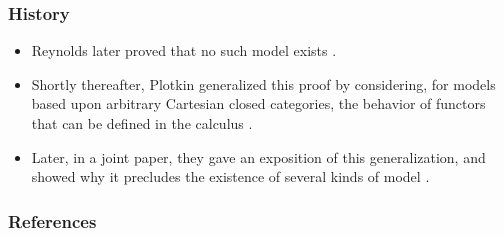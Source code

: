 \begin{frame}[fragile]
    \frametitle{History}
  
    \begin{itemize}
        \item Reynolds later proved that no such model exists \cite{reynold-not-set-theoretic}.
        \item Shortly thereafter, Plotkin generalized this proof by considering, for models based upon arbitrary Cartesian closed categories, the behavior of functors that can be defined in the calculus \cite{plotkin-non-existing-article}.
        \item Later, in a joint paper, they gave an exposition of this generalization, and showed why it precludes the existence of several kinds of model \cite{REYNOLDS19931}.
    \end{itemize}
\end{frame}

\begin{frame}[t,allowframebreaks]
\nocite{*}
\frametitle{References}


\end{frame}

